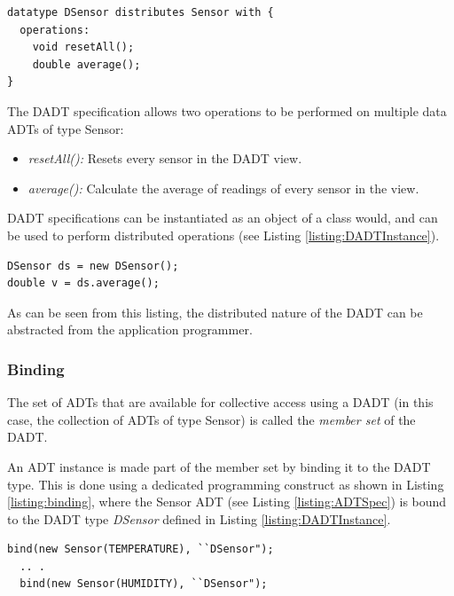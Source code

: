 \begin{lstlisting}[frame=trbl, basewidth={0.55em, 0.6em}, captionpos=b, 
basicstyle=\ttfamily\footnotesize, breaklines, caption = Data DADT 
specification (reproduced from \cite{migliavacca_DADT:2006}), label = 
listing:DADTSpec]
datatype DSensor distributes Sensor with {
  operations:
	void resetAll();
	double average();
}
\end{lstlisting}

The DADT specification allows two operations to be performed on multiple data 
ADTs of type Sensor:  
\begin{itemize}
\item \emph{resetAll():} Resets every sensor in the DADT view.
\item \emph{average():} Calculate the average of readings of every sensor in the
view.
\end{itemize}

DADT specifications can be instantiated as an object of a class would, and can
be used to perform distributed operations (see Listing \ref{listing:DADTInstance}).

\begin{lstlisting}[frame=trbl, basewidth={0.55em, 0.6em}, captionpos=b, 
basicstyle=\ttfamily\footnotesize, breaklines, caption = DADT Instantiation 
(reproduced from \cite{migliavacca_DADT:2006}), label = listing:DADTInstance ]
DSensor ds = new DSensor();
double v = ds.average();
\end{lstlisting}

As can be seen from this listing, the distributed nature of the DADT can be
abstracted from the application programmer.

\subsubsection{Binding}

The set of ADTs that are available for collective access using a DADT (in this
case, the collection of ADTs of type Sensor) is called the \emph{member set} of
the DADT.

An ADT instance is made part of the member set by binding it to the DADT type. This is done using a dedicated
programming construct as shown in Listing \ref{listing:binding}, where the
Sensor ADT (see Listing \ref{listing:ADTSpec}) is bound to the DADT type \emph{DSensor}
defined in Listing \ref{listing:DADTInstance}. 
 
\begin{lstlisting}[frame=trbl, basewidth={0.55em, 0.6em}, captionpos=b, 
basicstyle=\ttfamily\footnotesize, breaklines, caption = Binding ADT instances to a DADT instance, label = listing:binding ]
  bind(new Sensor(TEMPERATURE), ``DSensor");
  .. .
  bind(new Sensor(HUMIDITY), ``DSensor");
\end{lstlisting}


